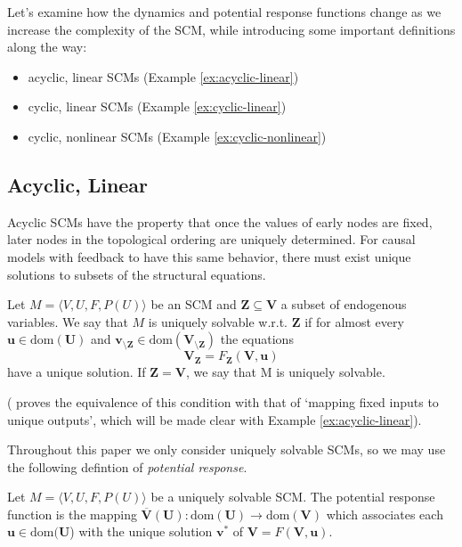 \documentclass[12pt]{article}
\begin{document}
Let’s examine how the dynamics and potential response functions change as we increase the complexity of the SCM, while introducing some important definitions along the way:
\begin{itemize}
  \item acyclic, linear SCMs (Example \ref{ex:acyclic-linear})
  \item cyclic, linear SCMs (Example \ref{ex:cyclic-linear})
  \item cyclic, nonlinear SCMs (Example \ref{ex:cyclic-nonlinear})
\end{itemize}

\subsection{Acyclic, Linear}

Acyclic SCMs have the property that once the values of early nodes are fixed, later nodes in the topological ordering are uniquely determined. For causal models with feedback to have this same behavior, there must exist unique solutions to subsets of the structural equations.

\begin{definition}
Let $M=\langle V,U,F,P(U)\rangle$ be an SCM and $\mathbf{Z}\subseteq\mathbf{V}$ a subset of endogenous variables. We say that $M$ is uniquely solvable w.r.t. $\mathbf{Z}$ if for almost every $\mathbf{u}\in\text{dom}(\mathbf{U})$ and $\mathbf{v}_{\setminus\mathbf{Z}}\in\text{dom}(\mathbf{V}_{\setminus\mathbf{Z}})$ the equations
\[
\mathbf{V}_{\mathbf{Z}} = F_{\mathbf{Z}}(\mathbf{V},\mathbf{u})
\]
have a unique solution. If $\mathbf{Z}=\mathbf{V}$, we say that M is uniquely solvable.
\end{definition}

(\cite{Foundations} proves the equivalence of this condition with that of `mapping fixed inputs to unique outputs', which will be made clear with Example \ref{ex:acyclic-linear}).

Throughout this paper we only consider uniquely solvable SCMs, so we may use the following defintion of \emph{potential response}.

\begin{definition}\label{defn:potential-response}
Let $M=\langle V,U,F,P(U)\rangle$ be a uniquely solvable SCM. 
The potential response function is the mapping $\overline{\mathbf{V}}(\mathbf{U}):\text{dom}(\mathbf{U})\to\text{dom}(\mathbf{V})$ which associates each $\mathbf{u}\in\text{dom}(\mathbf{U}$) with the unique solution $\mathbf{v}^*$ of $\mathbf{V} = F(\mathbf{V},\mathbf{u})$.
\end{definition}
\end{document}
